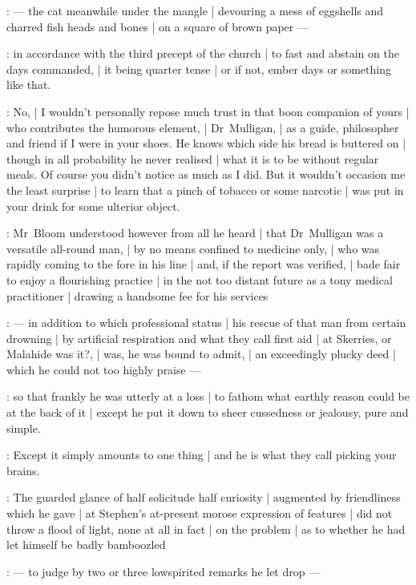 :
    --- the cat meanwhile under the mangle |
        devouring a mess of eggshells and charred fish heads and bones |
        on a square of brown paper ---

:
in accordance with the third precept of the church |
to fast and abstain on the days commanded, |
it being quarter tense |
or if not, ember days or something like that.

\Bloom:
No, |
I wouldn't personally repose much trust in that boon companion of yours |
who contributes the humorous element, |
Dr~Mulligan, |
as a guide, philosopher and friend if I were in your shoes.
He knows which side his bread is buttered on |
though in all probability he never realised |
what it is to be without regular meals.
Of course you didn't notice as much as I did.
But it wouldn't occasion me the least surprise |
to learn that a pinch of tobacco or some narcotic |
was put in your drink for some ulterior object.

:
Mr~Bloom understood however from all he heard |
that Dr~Mulligan was a versatile all-round man, |
by no means confined to medicine only, |
who was rapidly coming to the fore in his line |
and, if the report was verified, |
bade fair to enjoy a flourishing practice |
in the not too distant future as a tony medical practitioner |
drawing a handsome fee for his services

:
    --- in addition to which professional status |
        his rescue of that man from certain drowning |
        by artificial respiration and what they call first aid |
        at Skerries, or Malahide was it?, |
        was, he was bound to admit, |
        an exceedingly plucky deed |
        which he could not too highly praise ---

:
so that frankly he was utterly at a loss |
to fathom what earthly reason could be at the back of it |
except he put it down to sheer cussedness or jealousy, pure and simple.

\Bloom:
Except it simply amounts to one thing |
and he is what they call picking your brains.

:
The guarded glance of half solicitude half curiosity |
augmented by friendliness which he gave |
at Stephen's at-present morose expression of features |
did not throw a flood of light, none at all in fact |
on the problem |
as to whether he had let himself be badly bamboozled

:
    --- to judge by two or three lowspirited remarks he let drop ---

